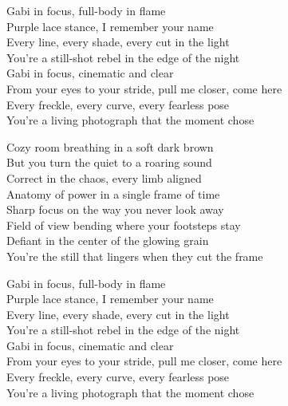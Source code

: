 \begin{lyrics}
Gabi in focus, full-body in flame\\
Purple lace stance, I remember your name\\
Every line, every shade, every cut in the light\\
You’re a still-shot rebel in the edge of the night\\
Gabi in focus, cinematic and clear\\
From your eyes to your stride, pull me closer, come here\\
Every freckle, every curve, every fearless pose\\
You’re a living photograph that the moment chose

Cozy room breathing in a soft dark brown\\
But you turn the quiet to a roaring sound\\
Correct in the chaos, every limb aligned\\
Anatomy of power in a single frame of time\\
Sharp focus on the way you never look away\\
Field of view bending where your footsteps stay\\
Defiant in the center of the glowing grain\\
You’re the still that lingers when they cut the frame

Gabi in focus, full-body in flame\\
Purple lace stance, I remember your name\\
Every line, every shade, every cut in the light\\
You’re a still-shot rebel in the edge of the night\\
Gabi in focus, cinematic and clear\\
From your eyes to your stride, pull me closer, come here\\
Every freckle, every curve, every fearless pose\\
You’re a living photograph that the moment chose
\end{lyrics}

